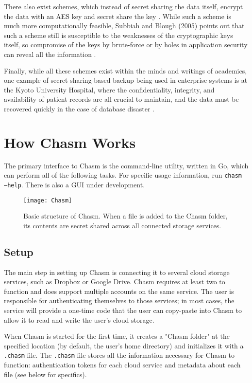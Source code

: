 \documentclass[letterpaper,twocolumn,10pt]{article}
\begin{document}
There also exist schemes, which instead of secret sharing the data itself, encrypt the data with an AES key and secret share the key \cite{herlihy}. While such a scheme is much more computationally feasible, Subbiah and Blough (2005) points out that such a scheme still is susceptible to the weaknesses of the cryptographic keys itself, so compromise of the keys by brute-force or by holes in application security can reveal all the information \cite{subbiah}.

Finally, while all these schemes exist within the minds and writings of academics, one example of secret sharing-based backup being used in enterprise systems is at the Kyoto University Hospital, where the confidentiality, integrity, and availability of patient records are all crucial to maintain, and the data must be recovered quickly in the case of database disaster \cite{kuroda}.

\section{How Chasm Works}

The primary interface to Chasm is the command-line utility, written in Go, which can perform all of the following tasks. For specific usage information, run \texttt{chasm ---help}. There is also a GUI under development.

\begin{figure}
\centering
\texttt{[image: Chasm]}
\caption{Basic structure of Chasm. When a file is added to the Chasm folder, its contents are secret shared across all connected storage services.}
\end{figure}
\subsection{Setup}
The main step in setting up Chasm is connecting it to several cloud storage services, such as Dropbox or Google Drive. Chasm requires at least two to function and does support multiple accounts on the same service. The user is responsible for authenticating themselves to those services; in most cases, the service will provide a one-time code that the user can copy-paste into Chasm to allow it to read and write the user's cloud storage.

When Chasm is started for the first time, it creates a "Chasm folder" at the specified location (by default, the user's home directory) and initializes it with a \texttt{.chasm} file. The \texttt{.chasm} file stores all the information necessary for Chasm to function: authentication tokens for each cloud service and metadata about each file (see below for specifics).
\end{document}

